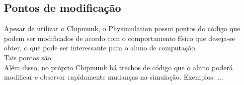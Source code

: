 \subsection{Pontos de modificação}
Apesar de utilizar o Chipmunk, o Physimulation possui pontos do código que podem ser modificados de acordo com o comportamento físico que deseja-se obter, o que pode ser interessante para o aluno de computação. \\

Tais pontos são... \\

Além disso, no próprio Chipmunk há trechos de código que o aluno poderá modificar e observar rapidamente mudanças na simulação. Exemplos: ...




